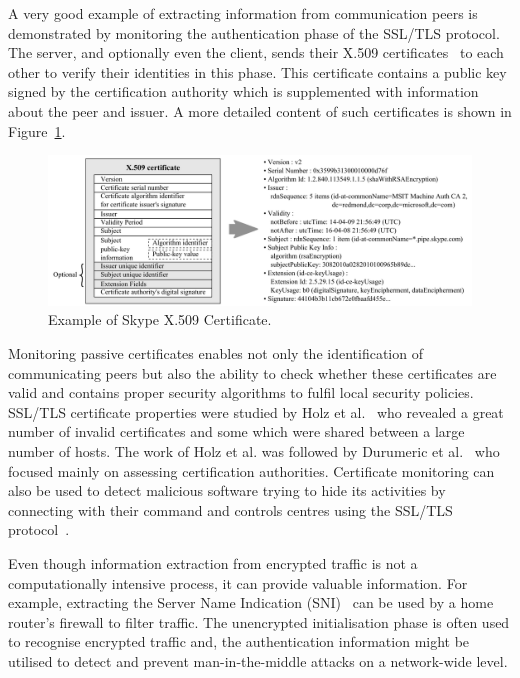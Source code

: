 A very good example of extracting information from communication peers is demonstrated by monitoring the authentication phase of the SSL/TLS protocol. The server, and optionally even the client, sends their X.509 certificates~\cite{rfc5280} to each other to verify their identities in this phase. This certificate contains a public key signed by the certification authority which is supplemented with information about the peer and issuer. A more detailed content of such certificates is shown in Figure~\ref{fig:certificates-contents}.

\begin{figure}[!ht]
    \begin{center}
        \includegraphics[width=0.9\linewidth]{figures/paper-encrypted/certificate}
        \caption{Example of Skype X.509 Certificate.}
        \label{fig:certificates-contents}
    \end{center}
\end{figure}

Monitoring passive certificates enables not only the identification of communicating peers but also the ability to check whether these certificates are valid and contains proper security algorithms to fulfil local security policies. SSL/TLS certificate properties were studied by Holz et al.~\cite{Holz-2011-SSL} who revealed a great number of invalid certificates and some which were shared between a large number of hosts. The work of Holz et al. was followed by Durumeric et al.~\cite{Durumeric-2013-Analysis} who focused mainly on assessing certification authorities. Certificate monitoring can also be used to detect malicious software trying to hide its activities by connecting with their command and controls centres using the SSL/TLS protocol~\cite{ssl-certificates-blacklist}.

Even though information extraction from encrypted traffic is not a computationally intensive process, it can provide valuable information. For example, extracting the Server Name Indication (SNI)~\cite{rfc4366} can be used by a home router's firewall to filter traffic. The unencrypted initialisation phase is often used to recognise encrypted traffic and, the authentication information might be utilised to detect and prevent man-in-the-middle attacks on a network-wide level.

